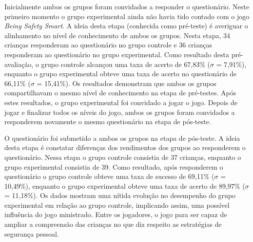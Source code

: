 
Inicialmente ambos os grupos foram convidados a responder o questionário. Neste primeiro momento o grupo experimental ainda não havia tido contado com o jogo \textit{Being Safety Smart}. A ideia desta etapa (conhecida como pré-teste) é averiguar o alinhamento no nível de conhecimento de ambos os grupos. Nesta etapa, 34 crianças responderam ao questionário no grupo controle e 36 crianças responderam ao questionário no grupo experimental. Como resultado desta pré-avaliação, o grupo controle alcançou uma taxa de acerto de 67,83\% ($\sigma$ = 7,91\%), enquanto o grupo experimental obteve uma taxa de acerto no questionário de 66,11\% ($\sigma$ = 15,41\%). Os resultados demonstram que ambos os grupos compartilhavam o mesmo nível de conhecimento na etapa de pré-testes. Após estes resultados, o grupo experimental foi convidado a jogar o jogo. Depois de jogar e finalizar todos os níveis do jogo, ambos os grupos foram convidados a responderem novamente o mesmo questionário na etapa de pós-teste. 

O questionário foi submetido a ambos os grupos na etapa de pós-teste. A ideia desta etapa é constatar diferenças dos rendimentos dos grupos ao responderem o questionário. Nessa etapa o grupo controle consistia de 37 crianças, enquanto o grupo experimental consistia de 39. Como resultado, após responderem o questionário o grupo controle obteve uma taxa de sucesso de 69,11\% ($\sigma$ = 10,49\%), enquanto o grupo experimental obteve uma taxa de acerto de 89,97\% ($\sigma$ = 11,18\%). Os dados mostram uma nítida evolução no desempenho do grupo experimental em relação ao grupo controle, implicando assim, uma possível influência do jogo ministrado. Entre os jogadores, o jogo para ser capaz de ampliar a compreensão das crianças no que diz respeito as estratégias de segurança pessoal.

